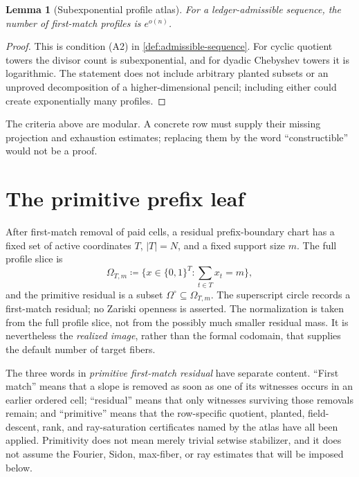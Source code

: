 \documentclass[12pt,a4paper]{amsart}
\numberwithin{equation}{section}
\newtheorem{lemma}[lemma]{Lemma}
\theoremstyle{remark}
\newcommand{\Omc}{\Omega^{\circ}}
\newcommand{\abs}[1]{\lvert #1\rvert}
\newcommand{\defeq}{\coloneqq}
\begin{document}
\begin{lemma}[Subexponential profile atlas]\label{lem:profile-atlas}
For a ledger-admissible sequence, the number of first-match profiles is
\(e^{o(n)}\).
\end{lemma}

\begin{proof}
This is condition (A2) in \cref{def:admissible-sequence}.  For cyclic
quotient towers the divisor count is subexponential, and for dyadic
Chebyshev towers it is logarithmic.  The statement does not include
arbitrary planted subsets or an unproved decomposition of a
higher-dimensional pencil; including either could create exponentially many
profiles.
\end{proof}

The criteria above are modular.  A concrete row must supply their missing
projection and exhaustion estimates; replacing them by the word
``constructible'' would not be a proof.
\section{The primitive prefix leaf}\label{sec:primitive-leaf}

After first-match removal of paid cells, a residual prefix-boundary chart
has a fixed set of active coordinates \(T\), \(\abs T=N\), and a fixed
support size \(m\).  The full profile slice is
\[
        \Omega_{T,m}\defeq\{x\in\{0,1\}^{T}:\sum_{t\in T}x_t=m\},
\]
and the primitive residual is a subset \(\Omc\subseteq\Omega_{T,m}\).
The superscript circle records a first-match residual; no Zariski openness
is asserted.  The normalization is taken from the full profile slice, not
from the possibly much smaller residual mass.  It is nevertheless the
\emph{realized image}, rather than the formal codomain, that supplies the
default number of target fibers.

The three words in \emph{primitive first-match residual} have separate
content.  ``First match'' means that a slope is removed as soon as one of
its witnesses occurs in an earlier ordered cell; ``residual'' means that
only witnesses surviving those removals remain; and ``primitive'' means
that the row-specific quotient, planted, field-descent, rank, and ray-saturation
certificates named by the atlas have all been applied.  Primitivity does
not mean merely trivial setwise stabilizer, and it does not assume the
Fourier, Sidon, max-fiber, or ray estimates that will be imposed below.
\end{document}
